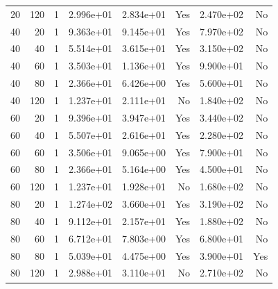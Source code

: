\documentclass[12pt]{article}
\begin{document}
\begin{table}[H]
\begin{tabular}{rrrrrrrr}
20 & 120 & 1 & 2.996e+01 & 2.834e+01 & Yes & 2.470e+02 & No \\
40 & 20 & 1 & 9.363e+01 & 9.145e+01 & Yes & 7.970e+02 & No \\
40 & 40 & 1 & 5.514e+01 & 3.615e+01 & Yes & 3.150e+02 & No \\
40 & 60 & 1 & 3.503e+01 & 1.136e+01 & Yes & 9.900e+01 & No \\
40 & 80 & 1 & 2.366e+01 & 6.426e+00 & Yes & 5.600e+01 & No \\
40 & 120 & 1 & 1.237e+01 & 2.111e+01 & No & 1.840e+02 & No \\
60 & 20 & 1 & 9.396e+01 & 3.947e+01 & Yes & 3.440e+02 & No \\
60 & 40 & 1 & 5.507e+01 & 2.616e+01 & Yes & 2.280e+02 & No \\
60 & 60 & 1 & 3.506e+01 & 9.065e+00 & Yes & 7.900e+01 & No \\
60 & 80 & 1 & 2.366e+01 & 5.164e+00 & Yes & 4.500e+01 & No \\
60 & 120 & 1 & 1.237e+01 & 1.928e+01 & No & 1.680e+02 & No \\
80 & 20 & 1 & 1.274e+02 & 3.660e+01 & Yes & 3.190e+02 & No \\
80 & 40 & 1 & 9.112e+01 & 2.157e+01 & Yes & 1.880e+02 & No \\
80 & 60 & 1 & 6.712e+01 & 7.803e+00 & Yes & 6.800e+01 & No \\
80 & 80 & 1 & 5.039e+01 & 4.475e+00 & Yes & 3.900e+01 & Yes \\
80 & 120 & 1 & 2.988e+01 & 3.110e+01 & No & 2.710e+02 & No \\
\bottomrule
\end{tabular}
\end{table}
\end{document}
